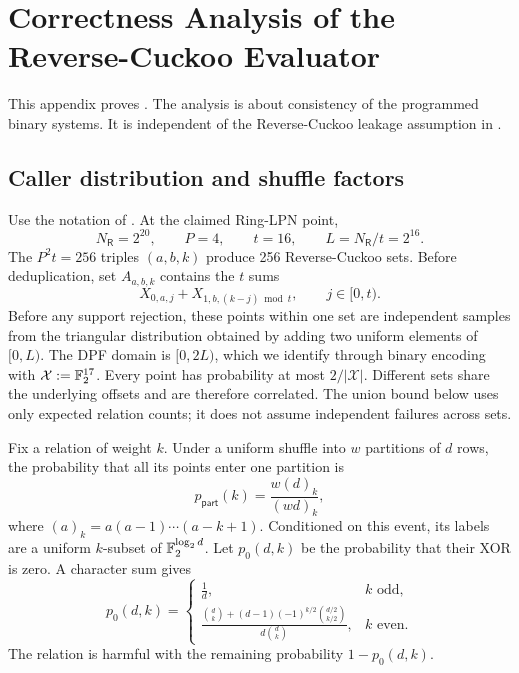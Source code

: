 \section{Correctness Analysis of the Reverse-Cuckoo Evaluator}
\label{app:revCuckooHash}

This appendix proves .  The
analysis is about consistency of the programmed binary systems.  It is
independent of the Reverse-Cuckoo leakage assumption in
.

\subsection{Caller distribution and shuffle factors}

Use the notation of .  At the claimed
Ring-LPN point,
\[
 N_{\mathsf R}=2^{20},
 \qquad P=4,
 \qquad t=16,
 \qquad L=N_{\mathsf R}/t=2^{16}.
\]
The $P^2t=256$ triples $(a,b,k)$ produce 256 Reverse-Cuckoo sets.  Before
deduplication, set $A_{a,b,k}$ contains the $t$ sums
\[
 X_{0,a,j}+X_{1,b,(k-j)\bmod t},
 \qquad j\in[0,t).
\]
Before any support rejection, these points within one set are independent samples from the triangular
distribution obtained by adding two uniform elements of $[0,L)$.  The DPF
domain is $[0,2L)$, which we identify through binary encoding with
$\mathcal X:=\mathbb{F}_2^{17}$.  Every point has probability at most
$2/|\mathcal X|$.  Different sets share the underlying offsets and are
therefore correlated.  The union bound below uses only expected relation
counts; it does not assume independent failures across sets.

Fix a relation of weight $k$.  Under a uniform shuffle into $w$ partitions of
$d$ rows, the probability that all its points enter one partition is
\begin{equation}\label{eq:rc-one-partition-prob}
 p_{\mathsf{part}}(k)=\frac{w(d)_k}{(wd)_k},
\end{equation}
where $(a)_k=a(a-1)\cdots(a-k+1)$.  Conditioned on this event, its labels are a
uniform $k$-subset of $\mathbb{F}_2^{\log_2d}$.  Let $p_0(d,k)$ be the probability that
their XOR is zero.  A character sum gives
\begin{equation}\label{eq:rc-zero-label-prob}
 p_0(d,k)=
 \begin{cases}
  \displaystyle\frac1d, & k\text{ odd},\\[2mm]
  \displaystyle\frac{\binom dk+(d-1)(-1)^{k/2}\binom{d/2}{k/2}}
                         {d\binom dk}, & k\text{ even}.
 \end{cases}
\end{equation}
The relation is harmful with the remaining probability $1-p_0(d,k)$.

